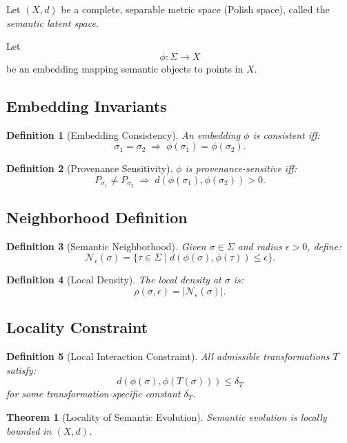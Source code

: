 \documentclass[11pt]{article}
\newtheorem{definition}{Definition}
\newtheorem{theorem}{Theorem}
\begin{document}
Let $(X,d)$ be a complete, separable metric space (Polish space), called the
\emph{semantic latent space}.  

Let
\[
\phi : \Sigma \to X
\]
be an embedding mapping semantic objects to points in $X$.

\subsection{Embedding Invariants}

\begin{definition}[Embedding Consistency]
An embedding $\phi$ is consistent iff:
\[
\sigma_1 = \sigma_2 \;\Rightarrow\; \phi(\sigma_1) = \phi(\sigma_2).
\]
\end{definition}

\begin{definition}[Provenance Sensitivity]
$\phi$ is provenance-sensitive iff:
\[
P_{\sigma_1} \neq P_{\sigma_2} \;\Rightarrow\; d(\phi(\sigma_1), \phi(\sigma_2)) > 0.
\]
\end{definition}

\subsection{Neighborhood Definition}

\begin{definition}[Semantic Neighborhood]
Given $\sigma \in \Sigma$ and radius $\epsilon > 0$, define:
\[
\mathcal{N}_\epsilon(\sigma)
=
\{ \tau \in \Sigma \mid d(\phi(\sigma), \phi(\tau)) \le \epsilon \}.
\]
\end{definition}

\begin{definition}[Local Density]
The local density at $\sigma$ is:
\[
\rho(\sigma,\epsilon) = |\mathcal{N}_\epsilon(\sigma)|.
\]
\end{definition}

\subsection{Locality Constraint}

\begin{definition}[Local Interaction Constraint]
All admissible transformations $T$ satisfy:
\[
d(\phi(\sigma), \phi(T(\sigma))) \le \delta_T
\]
for some transformation-specific constant $\delta_T$.
\end{definition}

\begin{theorem}[Locality of Semantic Evolution]
Semantic evolution is locally bounded in $(X,d)$.
\end{theorem}
\end{document}
